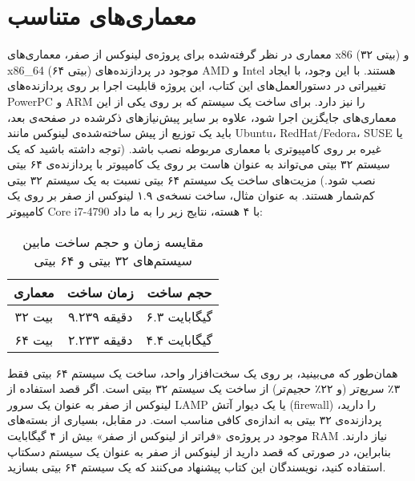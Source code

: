 \documentclass{book}
\begin{document}
\newpage

\section{معماری‌های متناسب}

معماری در نظر گرفته‌شده برای پروژه‌ی لینوکس از صفر، معماری‌های x86 (۳۲ بیتی) و x86\_64 (۶۴ بیتی) موجود در پردازنده‌های AMD و Intel هستند. با این وجود، با ایجاد تغییراتی در دستورالعمل‌های این کتاب، این پروژه قابلیت اجرا بر روی پردازنده‌های PowerPC و ARM را نیز دارد. برای ساخت یک سیستم که بر روی یکی از این معماری‌های جایگزین اجرا شود، علاوه بر سایر پیش‌نیازهای ذکرشده در صفحه‌ی بعد، باید یک توزیع از پیش ساخته‌شده‌ی لینوکس مانند Ubuntu، RedHat/Fedora، SUSE یا غیره بر روی کامپیوتری با معماری مربوطه نصب باشد. (توجه داشته باشید که یک سیستم ۳۲ بیتی می‌تواند به عنوان هاست بر روی یک کامپیوتر با پردازنده‌ی ۶۴ بیتی نصب شود.)
\newline
\newline
مزیت‌های ساخت یک سیستم ۶۴ بیتی نسبت به یک سیستم ۳۲ بیتی کم‌شمار هستند. به عنوان مثال، ساخت نسخه‌ی ۱.۹ لینوکس از صفر بر روی یک کامپیوتر Core i7-4790 با ۴ هسته، نتایج زیر را به ما داد:
\newline
\newline
\begin{table}[h]
    \centering
    \begin{tabular}{|c|c|c|}
        \hline
        معماری & زمان ساخت & حجم ساخت \\
        \hline
        ۳۲ بیت   & ۹.۲۳۹ دقیقه   & ۶.۳ گیگابایت   \\
        ۶۴ بیت   & ۲.۲۳۳ دقیقه   & ۴.۴ گیگابایت   \\
        \hline
    \end{tabular}
    \caption{مقایسه زمان و حجم ساخت مابین سیستم‌های ۳۲ بیتی و ۶۴ بیتی}
\end{table}
\newline
\newline
همان‌طور که می‌بینید، بر روی یک سخت‌افزار واحد، ساخت یک سیستم ۶۴ بیتی فقط ۳٪ سریع‌تر (و ۲۲٪ حجیم‌تر) از ساخت یک سیستم ۳۲ بیتی است. اگر قصد استفاده از لینوکس از صفر به عنوان یک سرور LAMP یا یک دیوار آتش (firewall) را دارید، پردازنده‌ی ۳۲ بیتی به اندازه‌ی کافی مناسب است. در مقابل، بسیاری از بسته‌های موجود در پروژه‌ی «فراتر از لینوکس از صفر» بیش از ۴ گیگابایت RAM نیاز دارند. بنابراین، در صورتی که قصد دارید از لینوکس از صفر به عنوان یک سیستم دسکتاپ استفاده کنید، نویسندگان این کتاب پیشنهاد می‌کنند که یک سیستم ۶۴ بیتی بسازید.
\newline
\end{document}
